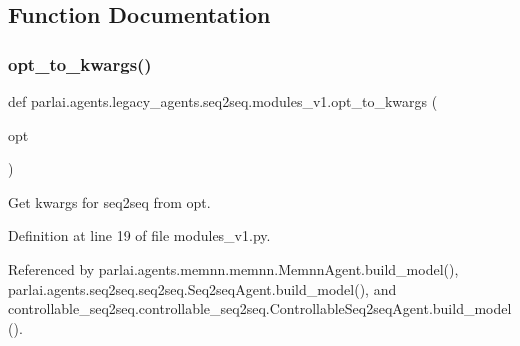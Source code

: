 \subsection{Function Documentation}
\mbox{\label{namespaceparlai_1_1agents_1_1legacy__agents_1_1seq2seq_1_1modules__v1_af13e3733abb5828b0c0a75d95833441c}} 
\subsubsection{\texorpdfstring{opt\+\_\+to\+\_\+kwargs()}{opt\_to\_kwargs()}}
{\footnotesize\ttfamily def parlai.\+agents.\+legacy\+\_\+agents.\+seq2seq.\+modules\+\_\+v1.\+opt\+\_\+to\+\_\+kwargs (\begin{DoxyParamCaption}\item[{}]{opt }\end{DoxyParamCaption})}

\begin{DoxyVerb}Get kwargs for seq2seq from opt.\end{DoxyVerb}
 

Definition at line 19 of file modules\+\_\+v1.\+py.



Referenced by parlai.\+agents.\+memnn.\+memnn.\+Memnn\+Agent.\+build\+\_\+model(), parlai.\+agents.\+seq2seq.\+seq2seq.\+Seq2seq\+Agent.\+build\+\_\+model(), and controllable\+\_\+seq2seq.\+controllable\+\_\+seq2seq.\+Controllable\+Seq2seq\+Agent.\+build\+\_\+model().

